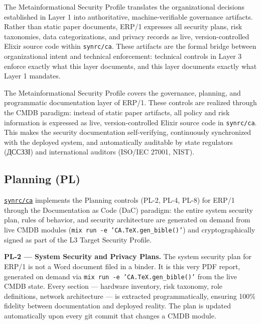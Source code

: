 \documentclass{article}
\begin{document}
The Metainformational Security Profile translates the organizational decisions established in Layer 1 into authoritative, machine-verifiable governance artifacts. Rather than static paper documents, ERP/1 expresses all security plans, risk taxonomies, data categorizations, and privacy records as live, version-controlled Elixir source code within \texttt{synrc/ca}. These artifacts are the formal bridge between organizational intent and technical enforcement: technical controls in Layer 3 enforce exactly what this layer documents, and this layer documents exactly what Layer 1 mandates.


The Metainformational Security Profile covers the governance, planning, and programmatic documentation layer of ERP/1. These controls are realized through the CMDB paradigm: instead of static paper artifacts, all policy and risk information is expressed as live, version-controlled Elixir source code in \texttt{synrc/ca}. This makes the security documentation self-verifying, continuously synchronized with the deployed system, and automatically auditable by state regulators (\foreignlanguage{ukrainian}{ДССЗЗІ}) and international auditors (ISO/IEC 27001, NIST).

\subsection{Planning (PL)}

\href{https://github.com/synrc/ca}{\texttt{synrc/ca}} implements the Planning controls (PL-2, PL-4, PL-8) for ERP/1 through the Documentation as Code (DaC) paradigm: the entire system security plan, rules of behavior, and security architecture are generated on demand from live CMDB modules (\texttt{mix run -e 'CA.TeX.gen\_bible()'}) and cryptographically signed as part of the L3 Target Security Profile.

\textbf{PL-2 --- System Security and Privacy Plans.}
The system security plan for ERP/1 is not a Word document filed in a binder. It is this very PDF report, generated on demand via \texttt{mix run -e 'CA.TeX.gen\_bible()'} from the live CMDB state. Every section --- hardware inventory, risk taxonomy, role definitions, network architecture --- is extracted programmatically, ensuring 100\% fidelity between documentation and deployed reality. The plan is updated automatically upon every git commit that changes a CMDB module.
\end{document}
